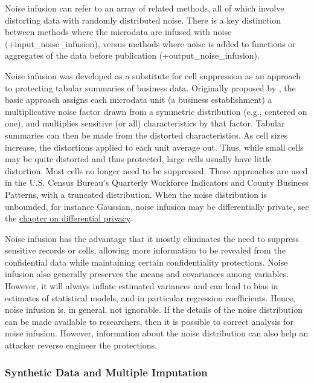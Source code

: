 \documentclass[
]{WileySix}
\begin{document}
Noise infusion can refer to an array of related methods, all of which involve distorting data with randomly distributed noise. There is a key distinction between methods where the microdata are infused with noise (+input\_noise\_infusion\textbar), versus methods where noise is added to functions or aggregates of the data before publication (+output\_noise\_infusion\textbar).

Noise infusion was developed as a substitute for cell suppression as an approach to protecting tabular summaries of business data. Originally proposed by \citet{evans_using_1998}, the basic approach assigns each microdata unit (a business establishment) a multiplicative noise factor drawn from a symmetric distribution (e.g., centered on one), and multiplies sensitive (or all) characteristics by that factor. Tabular summaries can then be made from the distorted characteristics. As cell sizes increase, the distortions applied to each unit average out. Thus, while small cells may be quite distorted and thus protected, large cells usually have little distortion. Most cells no longer need to be suppressed. These approaches are used in the U.S. Census Bureau's Quarterly Workforce Indicators \citetext{\citealp[ ]{abowd_lehd_2009}; \citealp{abowd_dynamically_2012}} and County Business Patterns, with a truncated distribution. When the noise distribution is unbounded, for instance Gaussian, noise infusion may be differentially private, see the \protect\hyperlink{diffpriv}{chapter on differential privacy}.

Noise infusion has the advantage that it mostly eliminates the need to suppress sensitive records or cells, allowing more information to be revealed from the confidential data while maintaining certain confidentiality protections. Noise infusion also generally preserves the means and covariances among variables. However, it will always inflate estimated variances and can lead to bias in estimates of statistical models, and in particular regression coefficients. Hence, noise infusion is, in general, not ignorable. If the details of the noise distribution can be made available to researchers, then it is possible to correct analysis for noise infusion. However, information about the noise distribution can also help an attacker reverse engineer the protections.

\hypertarget{synthetic-data-and-multiple-imputation}{%
\subsubsection{Synthetic Data and Multiple Imputation}\label{synthetic-data-and-multiple-imputation}}
\end{document}
